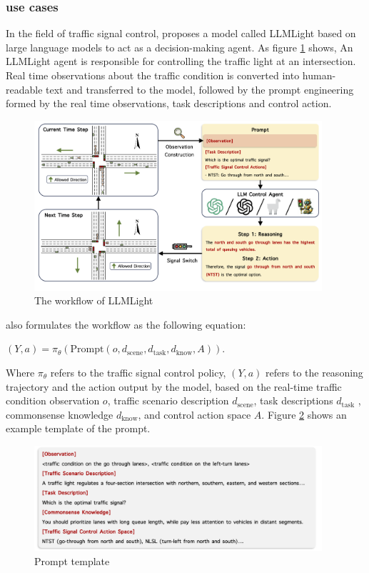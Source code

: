 \documentclass[runningheads]{llncs}
\begin{document}
\subsubsection{use cases}
\noindent \newline
In the field of traffic signal control, \cite{Lai23} proposes a model called LLMLight based on large language models to act as a decision-making agent. As figure \ref{fig:llmlight} shows,
An LLMLight agent is responsible for controlling the traffic light at an intersection. Real time observations about the traffic condition is converted into human-readable text and transferred to 
the model, followed by the prompt engineering formed by the real time observations, task descriptions and control action.
\begin{figure}[htbp]
  \centering
  \includegraphics[width=0.95\textwidth]{LLMLight.PNG}
  \caption{The workflow of LLMLight \cite{Lai23}}
  \label{fig:llmlight}
\end{figure}
\cite{Lai23} also formulates the workflow as the following equation:
\begin{definition}
  $(Y, a) = \pi_{\theta}(\text{Prompt}(o, d_{\text{scene}}, d_{\text{task}}, d_{\text{know}}, A))$.
\end{definition}
Where $\pi_{\theta}$ refers to the traffic signal control policy, $(Y, a)$ refers to the reasoning trajectory and the action output by the model,
based on the real-time traffic condition observation $o$, traffic scenario description $d_{\text{scene}}$, task descriptions $d_{\text{task}}$ , commonsense knowledge $d_{\text{know}}$, and control action space $A$.
Figure \ref{fig:llmlight_prompt} shows an example template of the prompt.
\begin{figure}[htbp]
  \centering
  \includegraphics[width=0.95\textwidth]{Prompt LLMLight.PNG}
  \caption{Prompt template \cite{Lai23}}
  \label{fig:llmlight_prompt}
\end{figure}
\end{document}
